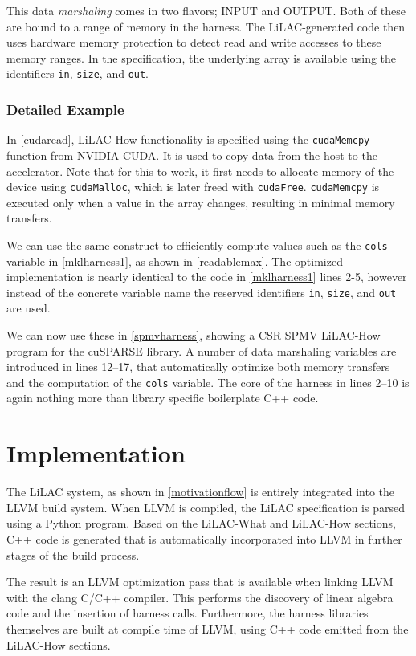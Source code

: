 This data {\em marshaling} comes in two flavors; INPUT and OUTPUT.
Both of these are bound to a range of memory in the harness.
The LiLAC-generated code then uses hardware memory protection to detect read and
write accesses to these memory ranges.
In the specification, the underlying array is available using the
identifiers {\tt in}, {\tt size}, and {\tt out}.

\subsubsection{Detailed Example}
In \autoref{cudaread}, LiLAC-How functionality is specified using the
\texttt{cudaMemcpy} function from NVIDIA CUDA.
It is used to copy data from the host to the accelerator.
Note that for this to work, it first needs to allocate memory of the
device using \texttt{cudaMalloc}, which is later freed with \texttt{cudaFree}.
\texttt{cudaMemcpy} is executed only when a value in the array changes,
resulting in minimal memory transfers.

We can use the same construct to efficiently compute values
such as the \texttt{cols} variable in \autoref{mklharness1}, as shown in
\autoref{readablemax}.
The optimized implementation is nearly identical to the code in
\autoref{mklharness1} lines 2-5, however instead of the concrete variable name
the reserved identifiers {\tt in}, {\tt size}, and {\tt out} are used.
\pagebreak

We can now use these in \autoref{spmvharness}, showing a CSR SPMV
LiLAC-How program for the cuSPARSE library.
A number of data marshaling variables are introduced in lines 12--17, that
automatically optimize both memory transfers and the computation of the
\texttt{cols} variable.
The core of the harness in lines 2--10 is again nothing more than 
library specific boilerplate C++ code.

\section{Implementation}
\label{sec:implementation}

    The LiLAC system, as shown in \autoref{motivationflow} is entirely
    integrated into the LLVM build system.
    When LLVM is compiled, the LiLAC specification is parsed using a Python
    program.
    Based on the LiLAC-What and LiLAC-How sections, C++ code is generated that
    is automatically incorporated into LLVM in further stages of the build
    process.

    The result is an LLVM optimization pass that is available when linking LLVM
    with the clang C/C++ compiler.
    This performs the discovery of linear algebra code and the insertion of
    harness calls.
    Furthermore, the harness libraries themselves are built at compile time of
    LLVM, using C++ code emitted from the LiLAC-How sections.

